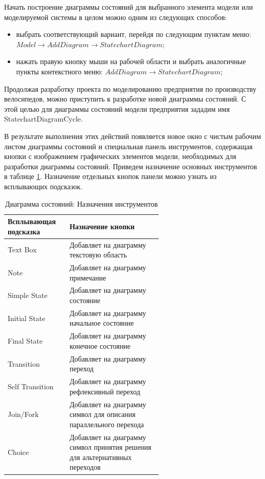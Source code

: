 \documentclass[a4paper,12pt]{report}
\begin{document}
Начать построение диаграммы состояний для выбранного элемента модели или моделируемой системы в целом можно одним из следующих способов:
\begin{itemize}
	\item выбрать соответствующий вариант, перейдя по следующим пунктам меню: \\$Model \to Add Diagram \to Statechart Diagram$;
	\item нажать правую кнопку мыши на рабочей области и выбрать аналогичные пункты контекстного меню: $Add Diagram \to Statechart Diagram$;
\end{itemize}

Продолжая разработку проекта по моделированию предприятия по производству велосипедов, можно приступить к разработке новой диаграммы состояний. С этой целью для диаграммы состояний модели предприятия зададим имя StatechartDiagramCycle.

В результате выполнения этих действий появляется новое окно с чистым рабочим листом диаграммы состояний и специальная панель инструментов, содержащая кнопки с изображением графических элементов модели, необходимых для разработки диаграммы состояний. Приведем назначение основных инструментов в таблице \ref{tab:toolboxstatechart}. Назначение отдельных кнопок панели можно узнать из всплывающих подсказок.

\begin{table}[h!]

	\begin{tabular}{|l|m{0.6\linewidth}|}
		\hline
		\textbf{Всплывающая подсказка} & \textbf{Назначение кнопки} \\ \hline
		Text Box & Добавляет на диаграмму текстовую область \\ \hline
		Note & Добавляет на диаграмму примечание \\ \hline
		Simple State & Добавляет на диаграмму состояние \\ \hline
		Initial State & Добавляет на диаграмму начальное состояние \\ \hline
		Final State & Добавляет на диаграмму конечное состояние \\ \hline
		Transition & Добавляет на диаграмму переход \\ \hline
		Self Transition & Добавляет на диаграмму рефлексивный переход \\ \hline
		Join/Fork & Добавляет на диаграмму символ для описания параллельного перехода \\ \hline
		Choice & Добавляет на диаграмму символ принятия решения для альтернативных переходов \\ \hline
	\end{tabular}
	\caption{Диаграмма состояний: Назначения инструментов}
	\label{tab:toolboxstatechart}
\end{table}
\end{document}
